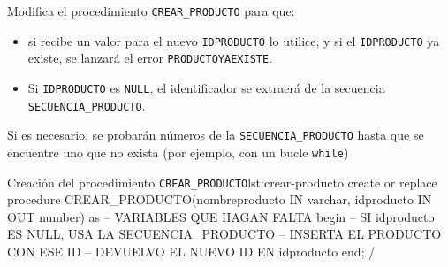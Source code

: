 \begin{homeworkProblem}

  Modifica el procedimiento \texttt{CREAR\_PRODUCTO} para que:
  \begin{itemize}
  \item   si recibe un valor para el nuevo \texttt{IDPRODUCTO} lo utilice,  y si el \texttt{IDPRODUCTO} ya existe, se lanzará el error \texttt{PRODUCTOYAEXISTE}.
  \item   Si \texttt{IDPRODUCTO} es \texttt{NULL}, el identificador se extraerá de la secuencia \texttt{SECUENCIA\_PRODUCTO}.  
  \end{itemize}

  


  \begin{Aviso}
    Si es necesario, se probarán números de la \texttt{SECUENCIA\_PRODUCTO} hasta que se encuentre uno que no exista (por ejemplo, con un bucle \texttt{while})
  \end{Aviso}


\begin{listadosql}{Creación del procedimiento \texttt{CREAR\_PRODUCTO}}{lst:crear-producto}
create or replace procedure CREAR_PRODUCTO(nombreproducto IN varchar, idproducto IN OUT number)
as 
  -- VARIABLES QUE HAGAN FALTA
begin
  -- SI idproducto ES NULL, USA LA SECUENCIA_PRODUCTO
  -- INSERTA EL PRODUCTO CON ESE ID
  -- DEVUELVO EL NUEVO ID EN idproducto
end;
/
\end{listadosql}

  
\end{homeworkProblem}


\newpage


